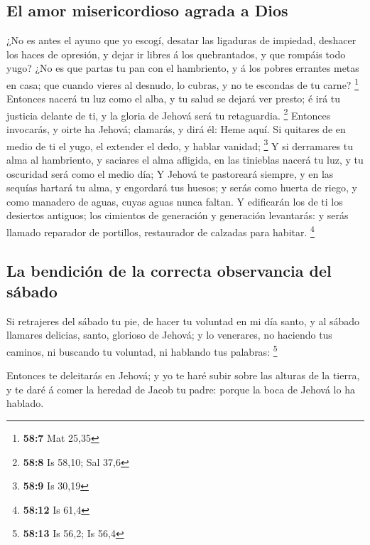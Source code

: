 \hypertarget{el-amor-misericordioso-agrada-a-dios}{%
\subsection{El amor misericordioso agrada a
Dios}\label{el-amor-misericordioso-agrada-a-dios}}

 ¿No es antes el ayuno que yo escogí, desatar las ligaduras
de impiedad, deshacer los haces de opresión, y dejar ir libres á los
quebrantados, y que rompáis todo yugo?  ¿No es que partas tu
pan con el hambriento, y á los pobres errantes metas en casa; que cuando
vieres al desnudo, lo cubras, y no te escondas de tu carne? \footnote{\textbf{58:7}
  Mat 25,35}  Entonces nacerá tu luz como el alba, y tu
salud se dejará ver presto; é irá tu justicia delante de ti, y la gloria
de Jehová será tu retaguardia. \footnote{\textbf{58:8} Is 58,10; Sal
  37,6}  Entonces invocarás, y oirte ha Jehová; clamarás, y
dirá él: Heme aquí. Si quitares de en medio de ti el yugo, el extender
el dedo, y hablar vanidad; \footnote{\textbf{58:9} Is 30,19}
 Y si derramares tu alma al hambriento, y saciares el alma
afligida, en las tinieblas nacerá tu luz, y tu oscuridad será como el
medio día;  Y Jehová te pastoreará siempre, y en las
sequías hartará tu alma, y engordará tus huesos; y serás como huerta de
riego, y como manadero de aguas, cuyas aguas nunca faltan. 
Y edificarán los de ti los desiertos antiguos; los cimientos de
generación y generación levantarás: y serás llamado reparador de
portillos, restaurador de calzadas para habitar. \footnote{\textbf{58:12}
  Is 61,4}

\hypertarget{la-bendiciuxf3n-de-la-correcta-observancia-del-suxe1bado}{%
\subsection{La bendición de la correcta observancia del
sábado}\label{la-bendiciuxf3n-de-la-correcta-observancia-del-suxe1bado}}

 Si retrajeres del sábado tu pie, de hacer tu voluntad en
mi día santo, y al sábado llamares delicias, santo, glorioso de Jehová;
y lo venerares, no haciendo tus caminos, ni buscando tu voluntad, ni
hablando tus palabras: \footnote{\textbf{58:13} Is 56,2; Is 56,4}

 Entonces te deleitarás en Jehová; y yo te haré subir sobre
las alturas de la tierra, y te daré á comer la heredad de Jacob tu
padre: porque la boca de Jehová lo ha hablado.

